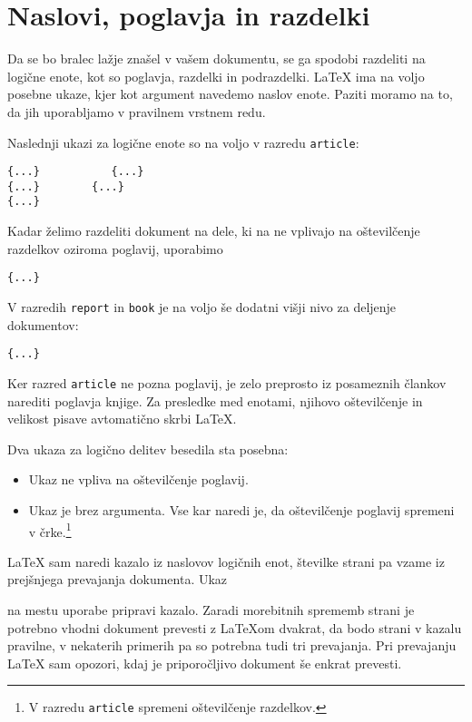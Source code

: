 \section{Naslovi, poglavja in razdelki}

Da se bo bralec lažje znašel v vašem dokumentu, se ga spodobi razdeliti na logične enote, kot so 
poglavja, razdelki in podrazdelki. \LaTeX{} ima na voljo posebne ukaze, kjer kot argument
navedemo naslov enote. Paziti moramo na to, da jih uporabljamo v pravilnem vrstnem redu.

Naslednji ukazi za logične enote so na voljo v razredu \texttt{article}: \nopagebreak
\begin{code}
\verb|{...}           |\verb|{...}|\\
\verb|{...}        |\verb|{...}|\\
\verb|{...}|
\end{code}

Kadar želimo razdeliti dokument na dele, ki na ne vplivajo na oštevilčenje
razdelkov oziroma poglavij, uporabimo
\begin{code}
\verb|{...}|
\end{code}

V razredih \texttt{report} in \texttt{book} je na voljo še dodatni
višji nivo za deljenje dokumentov:
\begin{code}
\verb|{...}|
\end{code}

Ker razred \texttt{article} ne pozna poglavij, je zelo preprosto iz posameznih člankov narediti
poglavja knjige. Za presledke med enotami, njihovo oštevil\-čen\-je in velikost pisave
avtomatično skrbi \LaTeX. 

\pagebreak[3]
Dva ukaza za logično delitev besedila sta posebna: 
\begin{itemize}
\item Ukaz  ne vpliva na oštevilčenje poglavij.  
\item Ukaz  je brez argumenta. Vse kar naredi je, da oštevilčenje poglavij 
  spremeni v črke.\footnote{V razredu \texttt{article} spremeni oštevilčenje razdelkov.}
\end{itemize}

\LaTeX{} sam naredi kazalo iz naslovov logičnih enot, številke strani pa vzame iz prejšnjega prevajanja dokumenta. 
Ukaz 
\begin{lscommand} 
\end{lscommand} 
\noindent na mestu uporabe pripravi kazalo. Zaradi morebitnih sprememb 
strani je 
potrebno vhodni dokument prevesti z \LaTeX{}om dvakrat, da bodo strani v kazalu pravilne, 
v nekaterih primerih pa so potrebna tudi tri prevajanja. Pri prevajanju \LaTeX{} sam opozori,
kdaj je priporočljivo dokument še enkrat prevesti.

